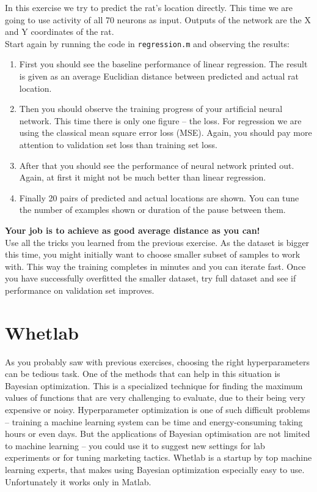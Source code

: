 \documentclass[a4paper,11pt]{article}
\begin{document}
In this exercise we try to predict the rat's location directly. This time we are going to use activity of all 70 neurons as input. Outputs of the network are the X and Y coordinates of the rat.\\

Start again by running the code in \texttt{regression.m} and observing the results:

\begin{enumerate}
	\item First you should see the baseline performance of linear regression. The result is given as an average Euclidian distance between predicted and actual rat location.
	\item Then you should observe the training progress of your artificial neural network. This time there is only one figure -- the loss. For regression we are using the classical mean square error loss (MSE). Again, you should pay more attention to validation set loss than training set loss.
	\item After that you should see the performance of neural network printed out. Again, at first it might not be much better than linear regression.
	\item Finally 20 pairs of predicted and actual locations are shown. You can tune the number of examples shown or duration of the pause between them.
\end{enumerate}

\textbf{Your job is to achieve as good average distance as you can!}\\

Use all the tricks you learned from the previous exercise. As the dataset is bigger this time, you might initially want to choose smaller subset of samples to work with. This way the training completes in minutes and you can iterate fast. Once you have successfully overfitted the smaller dataset, try full dataset and see if performance on validation set improves.

%
%
\section{Whetlab}

As you probably saw with previous exercises, choosing the right hyperparameters can be tedious task. One of the methods that can help in this situation is Bayesian optimization. This is a specialized technique for finding the maximum values of functions that are very challenging to evaluate, due to their being very expensive or noisy. Hyperparameter optimization is one of such difficult problems -- training a machine learning system can be time and energy-consuming taking hours or even days. But the applications of Bayesian optimisation are not limited to machine learning -- you could use it to suggest new settings for lab experiments or for tuning marketing tactics. Whetlab is a startup by top machine learning experts, that makes using Bayesian optimization especially easy to use. Unfortunately it works only in Matlab.\\
\end{document}
